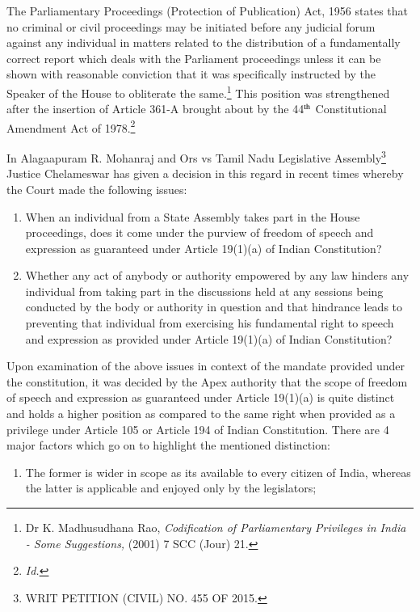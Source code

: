 \begin{multicols}{2}
\noi
The Parliamentary Proceedings (Protection of Publication) Act, 1956 states that no criminal
or civil proceedings may be initiated before any judicial forum against any individual in
matters related to the distribution of a fundamentally correct report which deals with the
Parliament proceedings unless it can be shown with reasonable conviction that it was
specifically instructed by the Speaker of the House to obliterate the same.\footnote{Dr K. Madhusudhana Rao, \textit{Codification of Parliamentary Privileges in India - Some Suggestions,} (2001) 7 SCC (Jour) 21.} This position was 
strengthened after the insertion of Article 361-A brought about by the 44$^{\rm th}$ Constitutional
Amendment Act of 1978.\footnote{\textit{Id.}}

\noi
In Alagaapuram R. Mohanraj and Ors vs Tamil Nadu Legislative Assembly\footnote{WRIT PETITION (CIVIL) NO. 455 OF 2015.} Justice Chelameswar has given a decision in this regard in recent times whereby the Court made the following issues:

\begin{enumerate}
\item When an individual from a State Assembly takes part in the House proceedings,
does it come under the purview of freedom of speech and expression as guaranteed
under Article 19(1)(a) of Indian Constitution?

\item Whether any act of anybody or authority empowered by any law hinders any
individual from taking part in the discussions held at any sessions being conducted
by the body or authority in question and that hindrance leads to preventing that
individual from exercising his fundamental right to speech and expression as
provided under Article 19(1)(a) of Indian Constitution?
\end{enumerate}

\noi
Upon examination of the above issues in context of the mandate provided under the
constitution, it was decided by the Apex authority that the scope of freedom of speech and
expression as guaranteed under Article 19(1)(a) is quite distinct and holds a higher position as
compared to the same right when provided as a privilege under Article 105 or Article 194 of
Indian Constitution. There are 4 major factors which go on to highlight the mentioned
distinction:

\begin{enumerate}[label=$\bullet$]
\item The former is wider in scope as its available to every citizen of India, whereas the
latter is applicable and enjoyed only by the legislators;


\end{enumerate}
\end{multicols}
